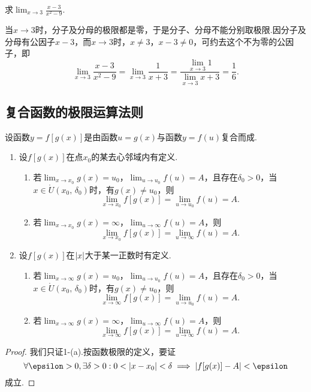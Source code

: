 \begin{example}
求\(\lim_{x \to 3}\frac{x-3}{x^2-9}\).
\begin{solution}
当\(x \to 3\)时，分子及分母的极限都是零，于是分子、分母不能分别取极限.因分子及分母有公因子\(x - 3\)，而\(x \to 3\)时，\(x \neq 3\)，\(x - 3 \neq 0\)，可约去这个不为零的公因子，即\[
\lim_{x \to 3}\frac{x - 3}{x^2 - 9}
= \lim_{x \to 3}\frac{1}{x + 3}
= \frac{\lim_{x \to 3} 1}{\lim_{x \to 3} x+3}
= \frac{1}{6}.
\]
\end{solution}
\end{example}

\subsection{复合函数的极限运算法则}
\begin{theorem}
设函数\(y=f[g(x)]\)是由函数\(u=g(x)\)与函数\(y=f(u)\)复合而成.
\begin{enumerate}
\item 设\(f[g(x)]\)在点\(x_0\)的某去心邻域内有定义.
\begin{enumerate}
\item 若\(\lim_{x \to x_0} g(x) = u_0\)，\(\lim_{u \to u_0} f(u) = A\)，且存在\(\delta_0 > 0\)，当\(x \in \mathring{U}(x_0,\,\delta_0)\)时，有\(g(x) \neq u_0\)，则\[
\lim_{x \to x_0} f[g(x)] = \lim_{u \to u_0} f(u) = A.
\]
\item 若\(\lim_{x \to x_0}g(x) = \infty\)，\(\lim_{u \to \infty}f(u) = A\)，则\[
\lim_{x \to x_0} f[g(x)] = \lim_{u \to \infty} f(u) = A.
\]
\end{enumerate}
\item 设\(f[g(x)]\)在\(\abs{x}\)大于某一正数时有定义.
\begin{enumerate}
\item 若\(\lim_{x \to \infty} g(x) = u_0\)，\(\lim_{u \to u_0} f(u) = A\)，且存在\(\delta_0 > 0\)，当\(x \in \mathring{U}(x_0,\,\delta_0)\)时，有\(g(x) \neq u_0\)，则\[
\lim_{x \to \infty} f[g(x)] = \lim_{u \to u_0} f(u) = A.
\]
\item 若\(\lim_{x \to \infty}g(x) = \infty\)，\(\lim_{u \to \infty}f(u) = A\)，则\[
\lim_{x \to \infty} f[g(x)] = \lim_{u \to \infty} f(u) = A.
\]
\end{enumerate}
\end{enumerate}
\begin{proof}
我们只证1-(a).按函数极限的定义，要证\[
\forall\epsilon>0, \exists\delta>0 :
0 < \abs{x - x_0} < \delta
\implies
\abs{ f[g(x)] - A } < \epsilon
\]成立.


\end{proof}
\end{theorem}
